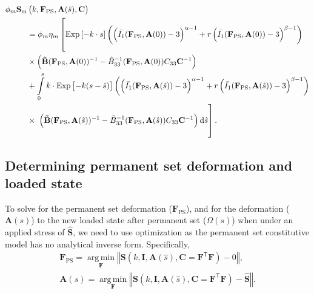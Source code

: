 \begin{equation} \label{eq:fullmatrix}
\begin{split}
\phi_m \mathbf{S}_\mathrm{m}&\left(k , \mathbf{F}_\mathrm{PS}, \mathbf{A}(\hat{s}), \mathbf{C}\right) \\
&= \phi_m \eta_m \left[ \vphantom{\int\displaylimits_0^s} \mathrm{Exp}\left[-k  \cdot s\right]  \left(\left( \bar{I_1} (\mathbf{F}_\mathrm{PS}, \mathbf{A}(0)) - 3\right)^{\alpha - 1} + r \left( \bar{I_1} (\mathbf{F}_\mathrm{PS}, \mathbf{A}(0)) - 3\right)^{\beta - 1}\right)  \right.\\
&\times \left( \mathbf{\tilde{B}}(\mathbf{F}_\mathrm{PS}, \mathbf{A}(0))^{-1} - \tilde{B}_{33}^{-1}(\mathbf{F}_\mathrm{PS}, \mathbf{A}(0))C_{33}\mathbf{C}^{-1}\right) \\
&+ \int\displaylimits_0^s k \cdot \mathrm{Exp}\left[-k (s - \hat{s})\right] \left(\left( \bar{I_1} (\mathbf{F}_\mathrm{PS}, \mathbf{A}(\hat{s})) - 3\right)^{\alpha - 1} + r \left( \bar{I_1} (\mathbf{F}_\mathrm{PS}, \mathbf{A}(\hat{s})) - 3\right)^{\beta - 1}\right) \\
&\times \left. \vphantom{\int\displaylimits_-^s} \left( \mathbf{\tilde{B}}(\mathbf{F}_\mathrm{PS}, \mathbf{A}(\hat{s}))^{-1} - \tilde{B}_{33}^{-1}(\mathbf{F}_\mathrm{PS}, \mathbf{A}(\hat{s}))C_{33}\mathbf{C}^{-1}\right) \mathrm{d}\hat{s}\right].
\end{split}
\end{equation}


\subsection{Determining permanent set deformation and loaded state}
To solve for the permanent set deformation ($\mathbf{F}_\mathrm{PS}$), and for the deformation ($\mathbf{A}(s)$) to the new loaded state after permanent set ($\Omega(s)$) when under an applied stress of $\mathbf{\hat{S}}$, we need to use optimization as the permanent set constitutive model has no analytical inverse form. Specifically,
\begin{equation}\label{eq:optimization}
\begin{gathered}
\mathbf{F}_\mathrm{PS} = \operatorname*{arg\,min}_\mathbf{F} \left\Vert \mathbf{S}\left(k , \mathbf{I}, \mathbf{A}(\hat{s}), \mathbf{C}=\mathbf{F}^\mathsf{T}\mathbf{F}\right) - 0 \right\Vert, \\
\mathbf{A}(s) = \operatorname*{arg\,min}_\mathbf{F} \left\Vert \mathbf{S}\left(k , \mathbf{I}, \mathbf{A}(\hat{s}), \mathbf{C}=\mathbf{F}^\mathsf{T}\mathbf{F}\right) - \mathbf{\hat{S}} \right\Vert.
\end{gathered}
\end{equation}

